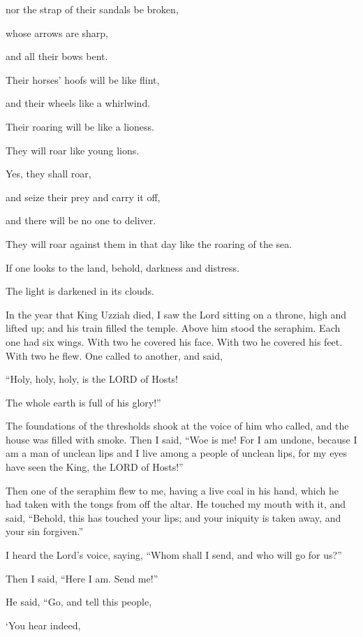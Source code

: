 nor the strap of their sandals be broken,

\myverse{}whose arrows are sharp,

and all their bows bent.

Their horses’ hoofs will be like flint,

and their wheels like a whirlwind.

\myverse{}Their roaring will be like a lioness.

They will roar like young lions.

Yes, they shall roar,

and seize their prey and carry it off,

and there will be no one to deliver.

\myverse{}They will roar against them in that day like the roaring of
the sea.

If one looks to the land, behold, darkness and distress.

The light is darkened in its clouds.


\mychapter{} \myverse*{}In the year that King Uzziah died, I saw the Lord sitting on a
throne, high and lifted up; and his train filled the temple.
\myverse{}Above him stood the seraphim. Each one had six wings. With two he covered his
face. With two he covered his feet. With two he flew.
\myverse{}One called to another, and said,

“Holy, holy, holy, is the LORD of Hosts!

The whole earth is full of his glory!”

\myverse{}The foundations of the thresholds shook at the voice of him who
called, and the house was filled with smoke.
\myverse{}Then I said, “Woe is me! For I am undone, because I am a man of unclean lips
and I live among a people of unclean lips, for my eyes have seen the King, the LORD of Hosts!”

\myverse{}Then one of the seraphim flew to me, having a live coal in his
hand, which he had taken with the tongs from off the altar.
\myverse{}He touched my mouth with it, and said, “Behold, this has touched your lips;
and your iniquity is taken away, and your sin forgiven.”

\myverse{}I heard the Lord’s voice, saying, “Whom shall I send, and who will
go for us?”

Then I said, “Here I am. Send me!”

\myverse{}He said, “Go, and tell this people,

‘You hear indeed,

